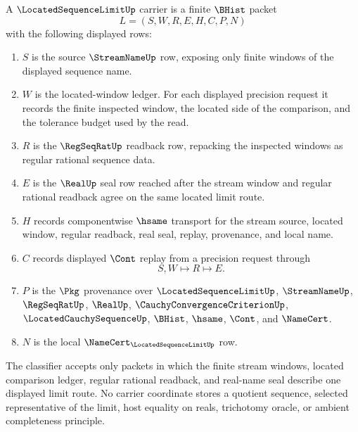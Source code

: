 \begin{definition}
\label{def:located-sequence-limit-carrier}
A $\LocatedSequenceLimitUp$ carrier is a finite $\BHist$ packet
$$
L=(S,W,R,E,H,C,P,N)
$$
with the following displayed rows:
\begin{enumerate}
\item $S$ is the source $\StreamNameUp$ row, exposing only finite windows of the displayed sequence name.
\item $W$ is the located-window ledger. For each displayed precision request it records the finite inspected window, the located side of the comparison, and the tolerance budget used by the read.
\item $R$ is the $\RegSeqRatUp$ readback row, repacking the inspected windows as regular rational sequence data.
\item $E$ is the $\RealUp$ seal row reached after the stream window and regular rational readback agree on the same located limit route.
\item $H$ records componentwise $\hsame$ transport for the stream source, located window, regular readback, real seal, replay, provenance, and local name.
\item $C$ records displayed $\Cont$ replay from a precision request through
$$
S,W \longmapsto R \longmapsto E .
$$
\item $P$ is the $\Pkg$ provenance over $\LocatedSequenceLimitUp$, $\StreamNameUp$, $\RegSeqRatUp$, $\RealUp$, $\CauchyConvergenceCriterionUp$, $\LocatedCauchySequenceUp$, $\BHist$, $\hsame$, $\Cont$, and $\NameCert$.
\item $N$ is the local $\NameCert_{\LocatedSequenceLimitUp}$ row.
\end{enumerate}
The classifier accepts only packets in which the finite stream windows, located comparison ledger, regular rational readback, and real-name seal describe one displayed limit route. No carrier coordinate stores a quotient sequence, selected representative of the limit, host equality on reals, trichotomy oracle, or ambient completeness principle.
\end{definition}

